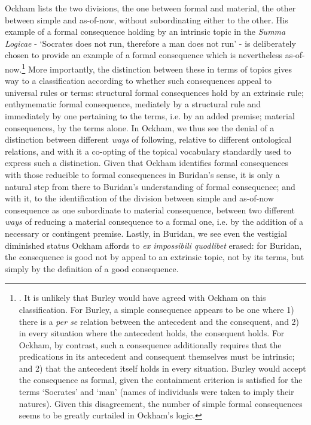 Ockham lists the two divisions, the one between formal and material, the other between simple and as-of-now, without subordinating either to the other. His example of a formal consequence holding by an intrinsic topic in the \textit{Summa Logicae} - `Socrates does not run, therefore a man does not run' - is deliberately chosen to provide an example of a formal consequence which is nevertheless as-of-now.\footnote{\cite[III-3. 1, p. 588]{OckhamSL}. It is unlikely that Burley would have agreed with Ockham on this classification. For Burley, a simple consequence appears to be one where 1) there is a \textit{per se} relation between the antecedent and the consequent, and 2) in every situation where the antecedent holds, the consequent holds. For Ockham, by contrast, such a consequence additionally requires that the predications in its antecedent and consequent themselves must be intrinsic; and 2) that the antecedent itself holds in every situation. Burley would accept the consequence as formal, given the containment criterion is satisfied for the terms `Socrates' and `man' (names of individuals were taken to imply their natures). Given this disagreement, the number of simple formal consequences seems to be greatly curtailed in Ockham's logic.} More importantly, the distinction between these in terms of topics gives way to a classification according to whether such consequences appeal to universal rules or terms: structural formal consequences hold by an extrinsic rule; enthymematic formal consequence, mediately by a structural rule and immediately by one pertaining to the terms, i.e. by an added premise; material consequences, by the terms alone. In Ockham, we thus see the denial of a distinction between different \textit{ways} of following, relative to different ontological relations, and with it a co-opting of the topical vocabulary standardly used to express such a distinction. Given that Ockham identifies formal consequences with those reducible to formal consequences in Buridan's sense, it is only a natural step from there to Buridan's understanding of formal consequence; and with it, to the identification of the division between simple and as-of-now consequence as one subordinate to material consequence, between two different \textit{ways} of reducing a material consequence to a formal one, i.e. by the addition of a necessary or contingent premise. Lastly, in Buridan, we see even the vestigial diminished status Ockham affords to \textit{ex impossibili quodlibet} erased: for Buridan, the consequence is good not by appeal to an extrinsic topic, not by its terms, but simply by the definition of a good consequence.

